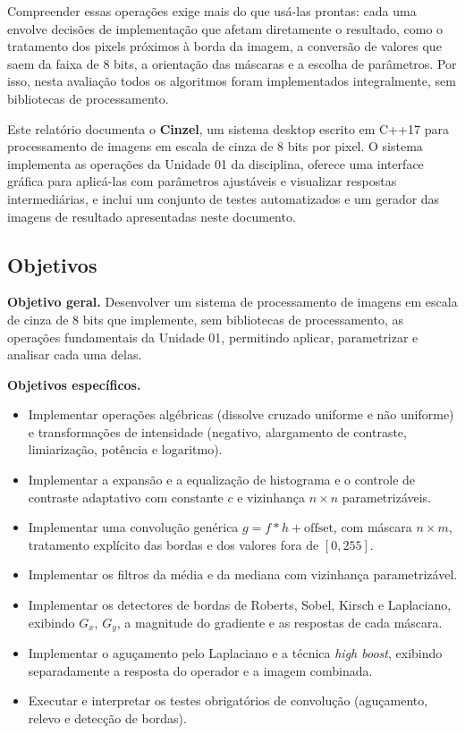 \documentclass[11pt,a4paper]{article}
\begin{document}
Compreender essas operações exige mais do que usá-las prontas: cada uma envolve decisões de
implementação que afetam diretamente o resultado, como o tratamento dos pixels próximos à
borda da imagem, a conversão de valores que saem da faixa de 8 bits, a orientação das
máscaras e a escolha de parâmetros. Por isso, nesta avaliação todos os algoritmos foram
implementados integralmente, sem bibliotecas de processamento.

Este relatório documenta o \textbf{Cinzel}, um sistema desktop escrito em C++17 para
processamento de imagens em escala de cinza de 8 bits por pixel. O sistema implementa as
operações da Unidade 01 da disciplina, oferece uma interface gráfica para aplicá-las com
parâmetros ajustáveis e visualizar respostas intermediárias, e inclui um conjunto de testes
automatizados e um gerador das imagens de resultado apresentadas neste documento.

\subsection{Objetivos}

\textbf{Objetivo geral.} Desenvolver um sistema de processamento de imagens em escala de
cinza de 8 bits que implemente, sem bibliotecas de processamento, as operações fundamentais
da Unidade 01, permitindo aplicar, parametrizar e analisar cada uma delas.

\textbf{Objetivos específicos.}
\begin{itemize}
  \item Implementar operações algébricas (dissolve cruzado uniforme e não uniforme) e
        transformações de intensidade (negativo, alargamento de contraste, limiarização,
        potência e logaritmo).
  \item Implementar a expansão e a equalização de histograma e o controle de contraste
        adaptativo com constante $c$ e vizinhança $n \times n$ parametrizáveis.
  \item Implementar uma convolução genérica $g = f * h + \text{offset}$, com máscara
        $n \times m$, tratamento explícito das bordas e dos valores fora de $[0, 255]$.
  \item Implementar os filtros da média e da mediana com vizinhança parametrizável.
  \item Implementar os detectores de bordas de Roberts, Sobel, Kirsch e Laplaciano,
        exibindo $G_x$, $G_y$, a magnitude do gradiente e as respostas de cada máscara.
  \item Implementar o aguçamento pelo Laplaciano e a técnica \textit{high boost}, exibindo
        separadamente a resposta do operador e a imagem combinada.
  \item Executar e interpretar os testes obrigatórios de convolução (aguçamento, relevo e
        detecção de bordas).
\end{itemize}
\end{document}
